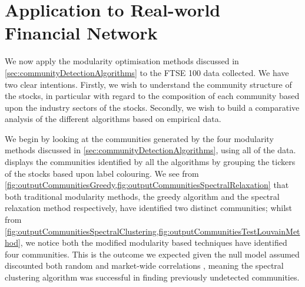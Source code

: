 
\section{Application to Real-world Financial Network}
\label{sec:applicationToRealWorldFinancialNetwork}

We now apply the modularity optimisation methods discussed in \cref{sec:communityDetectionAlgorithms} to the FTSE 100 data collected.
We have two clear intentions.
Firstly, we wish to understand the community structure of the stocks, in particular with regard to the composition of each community based upon the industry sectors of the stocks.
Secondly, we wish to build a comparative analysis of the different algorithms based on empirical data.

We begin by looking at the communities generated by the four modularity methods discussed in \cref{sec:communityDetectionAlgorithms}, using all of the data.
 displays the communities identified by all the algorithms by grouping the tickers of the stocks based upon label colouring.
We see from \cref{fig:outputCommunitiesGreedy,fig:outputCommunitiesSpectralRelaxation} that both traditional modularity methods, the greedy algorithm and the spectral relaxation method respectively, have identified two distinct communities; whilst from \cref{fig:outputCommunitiesSpectralClustering,fig:outputCommunitiesTestLouvainMethod}, we notice both the modified modularity based techniques have identified four communities.
This is the outcome we expected given the null model assumed discounted both random and market-wide correlations \cite{MG13}, meaning the spectral clustering algorithm was successful in finding previously undetected communities.

